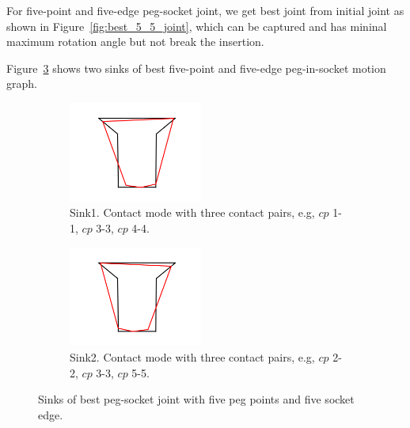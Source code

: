 For five-point and five-edge peg-socket joint, we get best joint from initial joint as shown in Figure~\ref{fig:best_5_5_joint}, which can be captured and has mininal maximum rotation angle but not break the insertion.

Figure~\ref{fig:best_5_5_sink} shows two sinks of best five-point and five-edge peg-in-socket motion graph. 

\begin{figure}
\begin{center}
\begin{subfigure}[t]{0.24\textwidth}
\begin{center}
\includegraphics[height=1.3in]{figures/best_5_5_sink1.png}
\end{center}
\label{fig:best_5_5_sink1}
\caption{Sink1. Contact mode with three contact pairs, e.g, ${cp}$ 1-1, ${cp}$ 3-3, ${cp}$ 4-4. }
\end{subfigure}
\begin{subfigure}[t]{0.24\textwidth}
\begin{center}
\includegraphics[height=1.3in]{figures/best_5_5_sink2.png}
\end{center}
\label{fig:best_5_5_sink2}
\caption{Sink2. Contact mode with three contact pairs, e.g, ${cp}$ 2-2, ${cp}$ 3-3, ${cp}$ 5-5. }
\end{subfigure}
\label{fig:best_5_5_sink}
\caption{Sinks of best peg-socket joint with five peg points and five socket edge. }
\end{center}
\end{figure}


